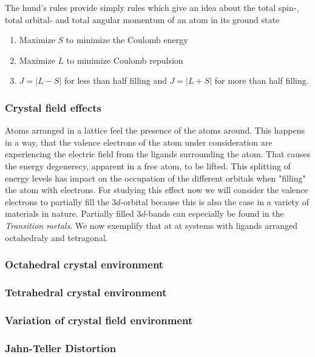 \documentclass[10pt]{report}
\numberwithin{equation}{chapter}
\begin{document}
The hund's rules provide simply rules which give an idea about the total spin-, total orbital- and total angular momentum of an atom in its ground state

\begin{enumerate}
  \item{Maximize $S$ to minimize the Coulomb energy}
  \item{Maximize $L$ to minimize Coulomb repulsion}
  \item{ $J=|L-S|$ for less than half filling and $J=|L+S|$ for more than half filling.}
\end{enumerate}

\subsubsection{Crystal field effects}

Atoms arranged in a lattice feel the presence of the atoms around. This happens in a way, that the valence electrons of the atom under consideration are experiencing the electric field from the ligands surrounding the atom. That causes the energy degenerecy, apparent in a free atom, to be lifted. This splitting of energy levels has impact on the occupation of the different orbitals when "filling" the atom with electrons.
For studying this effect now we will consider the valence electrons to partially fill the $3d$-orbital because this is also the case in a variety of materials in nature. Partially filled $3d$-bands can especially be found in the \textit{Transition metals}. 
 We now exemplify that at at systems with ligands arranged octahedraly and tetragonal. 


\subsubsection{Octahedral crystal environment}



\subsubsection{Tetrahedral crystal environment}


\subsubsection{Variation of crystal field environment}


\subsubsection{Jahn-Teller Distortion}
\end{document}

